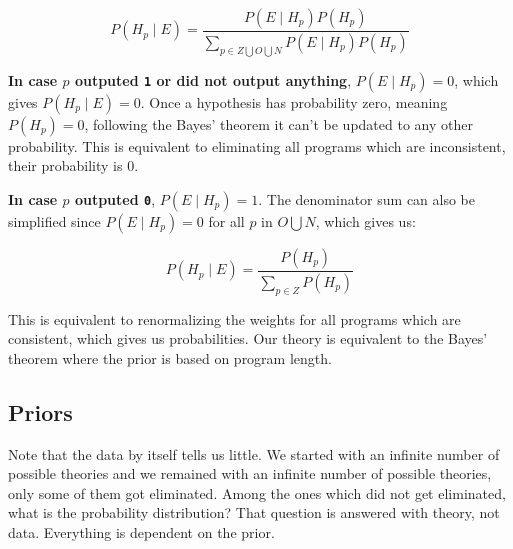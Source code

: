 \documentclass[oneside,hidelinks]{article}
\begin{document}
$$ P(H_{p} \mid E) = \frac{P(E \mid H_{p}) P(H_{p})}{\sum\limits_{p \in Z \bigcup O \bigcup N} P(E \mid H_p) P(H_p)} $$

\vspace{15px}

\textbf{In case $p$ outputed \texttt{1} or did not output anything}, $P(E \mid H_{p}) = 0$, which gives $P(H_{p} \mid E) = 0$.
Once a hypothesis has probability zero, meaning $P(H_p) = 0$, following the Bayes' theorem it can't be updated to any other probability.
This is equivalent to eliminating all programs which are inconsistent, their probability is $0$.

\vspace{15px}

\textbf{In case $p$ outputed \texttt{0}}, $P(E \mid H_{p}) = 1$.
The denominator sum can also be simplified since $P(E \mid H_{p}) = 0$ for all $p$ in $O \bigcup N$, which gives us:

$$ P(H_{p} \mid E) = \frac{P(H_{p})}{\sum\limits_{p \in Z } P(H_p)} $$

This is equivalent to renormalizing the weights for all programs which are consistent, which gives us probabilities.
Our theory is equivalent to the Bayes' theorem where the prior is based on program length.

\newpage

\subsection{Priors}

Note that the data by itself tells us little.
We started with an infinite number of possible theories and we remained with an infinite number of possible theories, only some of them got eliminated.
Among the ones which did not get eliminated, what is the probability distribution?
That question is answered with theory, not data.
Everything is dependent on the prior.
\end{document}
